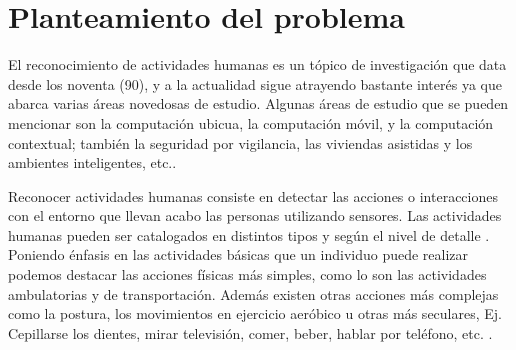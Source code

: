 \section{Planteamiento del problema}

\label{sec11:planteamiento}

El reconocimiento de actividades humanas es un tópico de investigación
que data desde los noventa (90), y a la actualidad sigue atrayendo
bastante interés ya que abarca varias áreas novedosas de estudio.
Algunas áreas de estudio que se pueden mencionar son la computación
ubicua, la computación móvil, y la computación contextual; también
la seguridad por vigilancia, las viviendas asistidas y los ambientes
inteligentes, etc.\cite{Chen2012}. 

Reconocer actividades humanas consiste en detectar las acciones o
interacciones con el entorno que llevan acabo las personas utilizando
sensores. Las actividades humanas pueden ser catalogados en distintos
tipos y según el nivel de detalle \cite{Chen2012}. Poniendo énfasis
en las actividades básicas que un individuo puede realizar podemos
destacar las acciones físicas más simples, como lo son las actividades
ambulatorias y de transportación. Además existen otras acciones más
complejas como la postura, los movimientos en ejercicio aeróbico u
otras más seculares, Ej. Cepillarse los dientes, mirar televisión,
comer, beber, hablar por teléfono, etc. \cite{LaraLabrador2013}.

